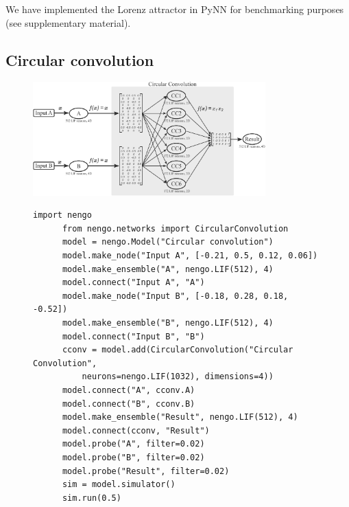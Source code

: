 \documentclass{frontiersSCNS}
\begin{document}
We have implemented the Lorenz attractor
in PyNN for benchmarking purposes
(see supplementary material).

\subsection{Circular convolution} \label{sec:cconv}

\begin{figure}
\begin{center}
  \includegraphics[width=0.8\textwidth]{cconv}
  \begin{minipage}{0.53\textwidth}
    \begin{lstlisting}[basicstyle={\footnotesize\ttfamily}]
      import nengo
      from nengo.networks import CircularConvolution
      model = nengo.Model("Circular convolution")
      model.make_node("Input A", [-0.21, 0.5, 0.12, 0.06])
      model.make_ensemble("A", nengo.LIF(512), 4)
      model.connect("Input A", "A")
      model.make_node("Input B", [-0.18, 0.28, 0.18, -0.52])
      model.make_ensemble("B", nengo.LIF(512), 4)
      model.connect("Input B", "B")
      cconv = model.add(CircularConvolution("Circular Convolution",
          neurons=nengo.LIF(1032), dimensions=4))
      model.connect("A", cconv.A)
      model.connect("B", cconv.B)
      model.make_ensemble("Result", nengo.LIF(512), 4)
      model.connect(cconv, "Result")
      model.probe("A", filter=0.02)
      model.probe("B", filter=0.02)
      model.probe("Result", filter=0.02)
      sim = model.simulator()
      sim.run(0.5)
    \end{lstlisting}
  \end{minipage}
  \begin{minipage}{0.43\textwidth}

\end{minipage}
\end{center}
\end{figure}
\end{document}
